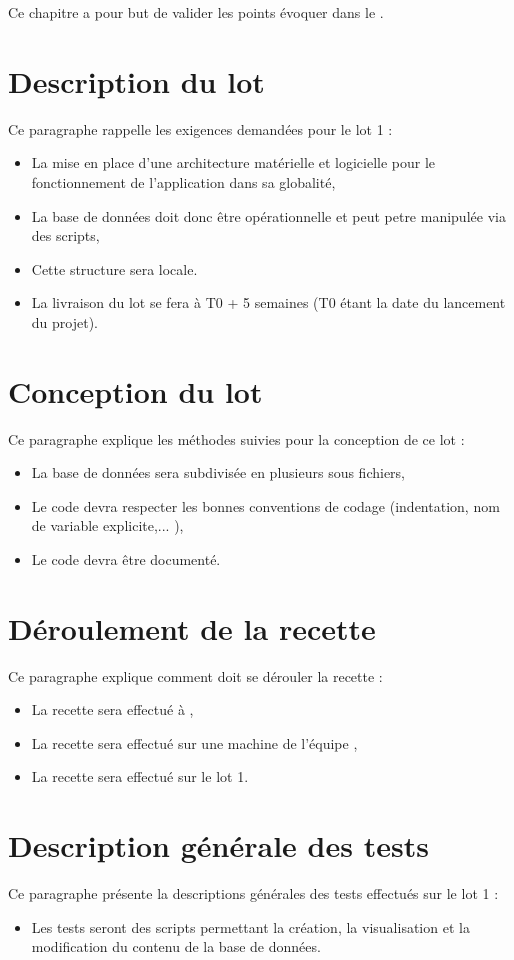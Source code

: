 	Ce chapitre a pour but de valider les points évoquer dans le \DSE.
	
\section{Description du lot}
	Ce paragraphe rappelle les exigences demandées pour le lot 1 :
	\begin{itemize}
		\item La mise en place d'une architecture matérielle et logicielle pour le fonctionnement de l'application dans sa globalité,
		\item La base de données doit donc être opérationnelle et peut petre manipulée via des scripts,
		\item Cette structure sera locale.
		\item La livraison du lot se fera à T0 + 5 semaines (T0 étant la date du lancement du projet).
	\end{itemize}
	
\section{Conception du lot}
	Ce paragraphe explique les méthodes suivies pour la conception de ce lot :
	\begin{itemize}
		\item La base de données sera subdivisée en plusieurs sous fichiers,
		\item Le code devra respecter les bonnes conventions de codage (indentation, nom de variable explicite,... ),
		\item Le code devra être documenté.
	\end{itemize}
	
\section{Déroulement de la recette}
	Ce paragraphe explique comment doit se dérouler la recette : 
	\begin{itemize}
		\item La recette sera effectué à \INSA,
		\item La recette sera effectué sur une machine de l'équipe \nomEquipe,
		\item La recette sera effectué sur le lot 1.
	\end{itemize}

\section{Description générale des tests}
	Ce paragraphe présente la descriptions générales des tests effectués sur le lot 1 :	
	\begin{itemize}
		\item Les tests seront des scripts permettant la création, la visualisation et la modification du contenu de la base de données.
	\end{itemize}

